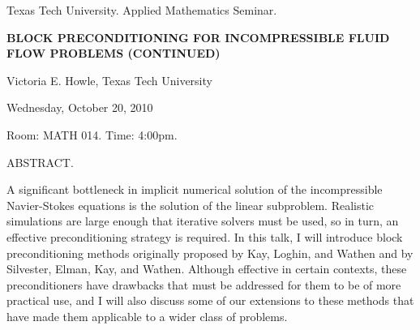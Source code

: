 \documentclass[oneside]{amsart}
\newcommand{\talktitle}{Block Preconditioning for Incompressible Fluid Flow Problems (continued)}
\newcommand{\talkspeaker}{Victoria E. Howle, Texas Tech University}
\newcommand{\talkdate}{Wednesday, October 20, 2010}
\newcommand{\talkabstract}{
A significant bottleneck in implicit numerical solution of the incompressible Navier-Stokes equations is the solution of the linear subproblem. Realistic simulations are large enough that iterative solvers must be used, so in turn, an effective preconditioning strategy is required. In this talk, I will introduce block preconditioning methods originally proposed by Kay, Loghin, and Wathen and by Silvester, Elman, Kay, and Wathen.  Although effective in certain contexts, these preconditioners have drawbacks that must be addressed for them to be of more practical use, and I will also discuss some of our extensions to these methods that have made them applicable to a wider class of problems.
}
\begin{document}
\thispagestyle{empty}

\begin{center}
Texas Tech University.  Applied Mathematics Seminar.

\end{center}

\begin{center}

\textbf{\LARGE {\uppercase{\talktitle}} }

\talkspeaker

\talkdate

Room: MATH 014.  Time: 4:00pm.

\end{center}

ABSTRACT.
\talkabstract
\end{document}
